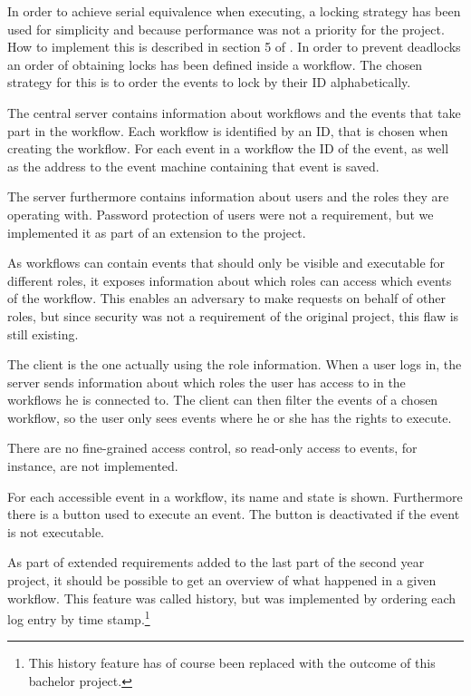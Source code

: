		\newpar In order to achieve serial equivalence when executing, a locking strategy has been used for simplicity and because performance was not a priority for the project. How to implement this is described in section 5 of \cite{debois2015concurrency}. In order to prevent deadlocks an order of obtaining locks has been defined inside a workflow. The chosen strategy for this is to order the events to lock by their ID alphabetically.
		
		\newpar The central server contains information about workflows and the events that take part in the workflow. Each workflow is identified by an ID, that is chosen when creating the workflow. For each event in a workflow the ID of the event, as well as the address to the event machine containing that event is saved.
		
		\newpar The server furthermore contains information about users and the roles they are operating with. Password protection of users were not a requirement, but we implemented it as part of an extension to the project.
		
		\newpar As workflows can contain events that should only be visible and executable for different roles, it exposes information about which roles can access which events of the workflow. This enables an adversary to make requests on behalf of other roles, but since security was not a requirement of the original project, this flaw is still existing.
		
		\newpar The client is the one actually using the role information. When a user logs in, the server sends information about which roles the user has access to in the workflows he is connected to. The client can then filter the events of a chosen workflow, so the user only sees events where he or she has the rights to execute.
		
		There are no fine-grained access control, so read-only access to events, for instance, are not implemented.
		
		\newpar For each accessible event in a workflow, its name and state is shown. Furthermore there is a button used to execute an event. The button is deactivated if the event is not executable.
		
		\newpar As part of extended requirements added to the last part of the second year project, it should be possible to get an overview of what happened in a given workflow. This feature was called history, but was implemented by ordering each log entry by time stamp.\footnote{This history feature has of course been replaced with the outcome of this bachelor project.}
		
